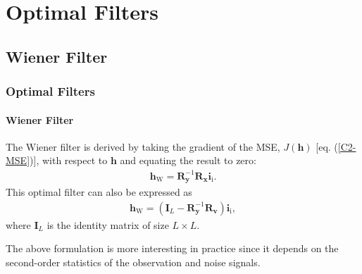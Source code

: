 \documentclass[10pt,pdflatex,headrule,landscape]{beamer}
\begin{document}
\begin{frame}[allowframebreaks]
\end{frame}


\section{Optimal Filters}
\subsection{Wiener Filter}
\begin{frame}
    \frametitle{Optimal Filters}
    \framesubtitle{Wiener Filter}

The Wiener filter is derived by taking the gradient of the MSE, $J\left( \mathbf{h} \right)$ [eq. (\ref{C2-MSE})], with respect to $\mathbf{h}$ and equating the result to zero:
\begin{eqnarray}
 \label{C2-Wiener-filt}
 \mathbf{h}_{\mathrm{W}} = \mathbf{R}_{\mathbf{y}}^{-1} \mathbf{R}_{\mathbf{x}} \mathbf{i}_{\mathrm{i}} .
\end{eqnarray}
This optimal filter can also be expressed as
\begin{eqnarray}
 \label{C2-Wiener-filt2}
 \mathbf{h}_{\mathrm{W}} = \left( \mathbf{I}_L - \mathbf{R}_{\mathbf{y}}^{-1}
 \mathbf{R}_{\mathbf{v}} \right) \mathbf{i}_{\mathrm{i}},
\end{eqnarray}
where $\mathbf{I}_L$ is the identity matrix of size $L \times L$.

The above formulation is more interesting in practice since it depends on the second-order statistics of the observation and noise signals.

\end{frame}
\end{document}
